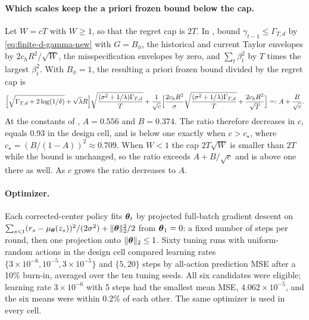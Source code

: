\paragraph{Which scales keep the a priori frozen bound below the cap.}
Let $W=cT$ with $W\ge1$, so that the regret cap is $2T$. In
, bound $\gamma_{t-1}\le\Gamma_{T,d}$ by
\eqref{eq:finite-d-gamma-new} with $G=B_\phi$, the historical and current
Taylor envelopes by $2c_hR^2/\sqrt W$, the misspecification envelopes by zero,
and $\sum_t\beta_t^2$ by $T$ times the largest $\beta_t^2$. With $B_\phi=1$,
the resulting a priori frozen bound divided by the regret cap is
\[
 \Bigl[\sqrt{\Gamma_{T,d}+2\log(1/\delta)}+\sqrt\lambda R\Bigr]
 \sqrt{\frac{(\sigma^2+1/\lambda)\Gamma_{T,d}}{T}}
 +\frac{1}{\sqrt c}\Bigl[\frac{2c_hR^2}{\sigma}
 \sqrt{\frac{(\sigma^2+1/\lambda)\Gamma_{T,d}}{T}}
 +\frac{2c_hR^2}{\sqrt T}\Bigr]
 =:A+\frac{B}{\sqrt c}.
\]
At the constants of , $A=0.556$ and $B=0.374$. The
ratio therefore decreases in $c$, equals 0.93 in the design cell, and is below
one exactly when $c>c_\star$, where $c_\star=(B/(1-A))^2\approx0.709$. When $W<1$ the cap $2T\sqrt W$ is
smaller than $2T$ while the bound is unchanged, so the ratio exceeds $A+B/\sqrt
c$ and is above one there as well. As $c$ grows the ratio decreases to $A$.

\paragraph{Optimizer.}
Each corrected-center policy fits $\boldsymbol{\theta}_t$ by projected full-batch gradient
descent on $\sum_{s<t}(r_s-\mu_{\boldsymbol{\theta}}(z_s))^2/(2\sigma^2)+\|\boldsymbol{\theta}\|_2^2/2$
from $\boldsymbol{\theta}_1=0$: a fixed number of steps per round, then one projection
onto $\|\boldsymbol{\theta}\|_2\le1$. Sixty tuning runs with uniform-random actions in the
design cell compared learning rates $\{3\times10^{-6},10^{-5},3\times10^{-5}\}$
and $\{5,20\}$ steps by all-action prediction MSE after a 10\% burn-in,
averaged over the ten tuning seeds. All six candidates were eligible; learning
rate $3\times10^{-6}$ with 5 steps had the smallest mean MSE,
$4.062\times10^{-5}$, and the six means were within 0.2\% of each other. The
same optimizer is used in every cell.

